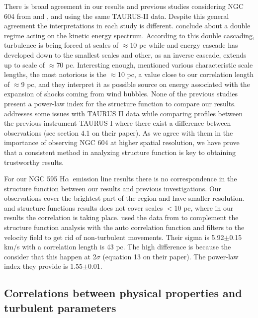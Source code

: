 \documentclass[fleqn,usenatbib, useAMS, a4paper]{mnras}
\newcommand\halpha{H${\alpha}$}
\begin{document}
There is broad agreement in our results and previous studies considering NGC 604 from \citet{tanco1997} and \citet{2019arXiv191203543M}, and using the same TAURUS-II data.
Despite this general agreement the interpretations in each study is different.
\citet{tanco1997} conclude about a double regime acting on the kinetic energy spectrum.
According to this double cascading, turbulence is being forced at scales of \(\approx\)10 pc while and energy cascade has developed down to the smallest scales and other, as an inverse cascade, extends up to scale of \(\approx\)70 pc.
Interesting enough, \citet{tanco1997} mentioned various characteristic scale lengths, the most notorious is the \(\approx\)10 pc, a value close to our correlation length of \(\approx\)9 pc, and they interpret it as possible source on energy associated with the expansion of shocks coming from wind bubbles.  
None of the previous studies present a power-law index for the structure function to compare our results.
\citet{2019arXiv191203543M} addresses some issues with TAURUS II data while comparing profiles between the previous instrument TAURUS I where there exist a difference between observations (see section 4.1 on their paper).
As we agree with them in the importance of observing NGC 604 at higher spatial resolution, we have prove that a consistent method in analyzing structure function is key to obtaining trustworthy results.

For our NGC 595 \halpha\ emission line results there is no correspondence in the structure function between our results and previous investigations.
Our observations cover the brightest part of the region and have smaller resolution.
\citet{lagrois2009multi} and \citet{lagrois2011} structure functions results does not cover scales $<$10 pc, where in our results the correlation is taking place.
\citet{lagrois2011} used the data from \citet{lagrois2009multi} to complement the structure function analysis with the auto correlation function and filters to the velocity field to get rid of non-turbulent movements.
Their sigma is 5.92$\pm$0.15 km/s with a correlation length is 43 pc.
The high difference is because the consider that this happen at 2$\sigma$ (equation 13 on their paper).
The power-law index they provide is 1.55$\pm$0.01.

\subsection{Correlations between physical properties and turbulent parameters}
\end{document}
